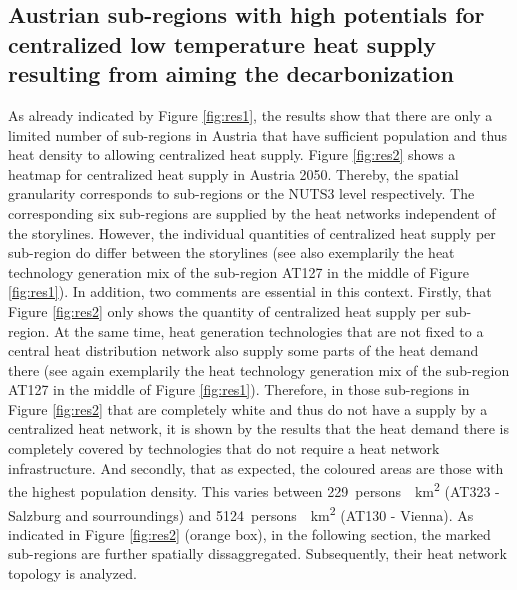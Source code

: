 \subsection{Austrian sub-regions with high potentials for centralized low temperature heat supply resulting from aiming the decarbonization}\label{res:3}
As already indicated by Figure \ref{fig:res1}, the results show that there are only a limited number of sub-regions in Austria that have sufficient population and thus heat density to allowing centralized heat supply. Figure \ref{fig:res2} shows a heatmap for centralized heat supply in Austria 2050. Thereby, the spatial granularity corresponds to sub-regions or the NUTS3 level respectively. The corresponding six sub-regions are supplied by the heat networks independent of the storylines. However, the individual quantities of centralized heat supply per sub-region do differ between the storylines (see also exemplarily the heat technology generation mix of the sub-region AT127 in the middle of Figure \ref{fig:res1}). In addition, two comments are essential in this context. Firstly, that Figure \ref{fig:res2} only shows the quantity of centralized heat supply per sub-region. At the same time, heat generation technologies that are not fixed to a central heat distribution network also supply some parts of the heat demand there (see again exemplarily the heat technology generation mix of the sub-region AT127 in the middle of Figure \ref{fig:res1}). Therefore, in those sub-regions in Figure \ref{fig:res2} that are completely white and thus do not have a supply by a centralized heat network, it is shown by the results that the heat demand there is completely covered by technologies that do not require a heat network infrastructure. And secondly, that as expected, the coloured areas are those with the highest population density. This varies between \SI{229}{persons \per \kilo\metre^2} (AT323 - Salzburg and sourroundings) and \SI{5124}{persons \per \kilo\metre^2} (AT130 - Vienna). As indicated in Figure \ref{fig:res2} (orange box), in the following section, the marked sub-regions are further spatially dissaggregated. Subsequently, their heat network topology is analyzed. 

